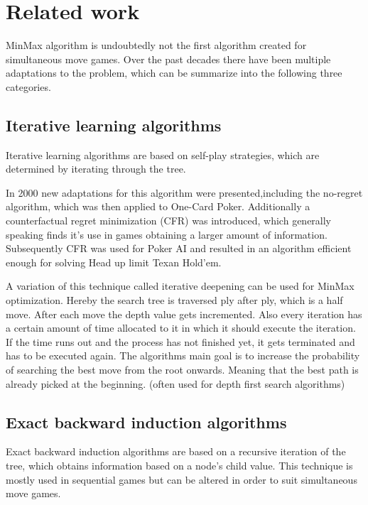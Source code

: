 \documentclass[conference,pdf,table,xcdraw, utf8]{IEEEtran}
\begin{document}




\section{Related work}
MinMax algorithm is undoubtedly not the first algorithm created for simultaneous move games. Over the past decades there have been multiple adaptations to the problem, which can be summarize into the following three categories.
\cite{branislav2016algorithms}

\subsection{Iterative learning algorithms}
Iterative learning algorithms are based on self-play strategies, which are determined by iterating through the tree.

In 2000 new adaptations for this algorithm were presented,including the no-regret algorithm, which was then applied to One-Card Poker. Additionally a counterfactual regret minimization (CFR) was introduced, which generally speaking finds it's use in games obtaining a larger amount of information. Subsequently CFR was used for Poker AI and resulted in an algorithm efficient enough for solving Head up limit Texan Hold'em. \cite{bowling2015hold'em_poker}

A variation of this technique called iterative deepening can be used for MinMax optimization. Hereby the search tree is traversed ply after ply, which is a half move. After each move the depth value gets incremented. Also every iteration has a certain amount of time allocated to it in which it should execute the iteration. If the time runs out and the process has not finished yet, it gets terminated and has to be executed again.
The algorithms main goal is to increase the probability of searching the best move from the root onwards. Meaning that the best path is already picked at the beginning. (often used for depth first search algorithms)


\subsection{Exact backward induction algorithms}
Exact backward induction algorithms are based on a recursive iteration of the tree, which obtains information based on a node's child value. This technique is mostly used in sequential games but can be altered in order to suit  simultaneous move games.
\end{document}
